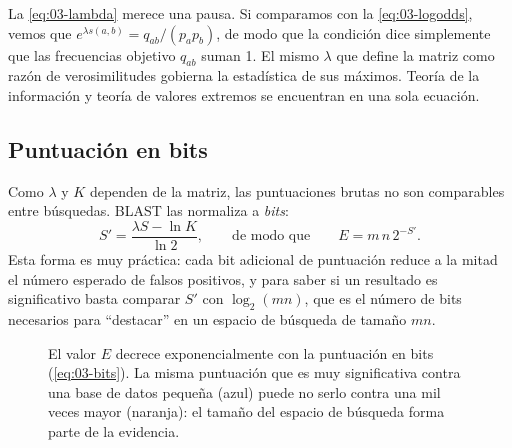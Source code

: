 La \cref{eq:03-lambda} merece una pausa. Si comparamos con la \cref{eq:03-logodds}, vemos que $e^{\lambda s(a,b)} = q_{ab}/(p_ap_b)$, de modo que la condición dice simplemente que las frecuencias objetivo $q_{ab}$ suman 1. El mismo $\lambda$ que define la matriz como razón de verosimilitudes gobierna la estadística de sus máximos. Teoría de la información y teoría de valores extremos se encuentran en una sola ecuación.

\subsection{Puntuación en bits}

Como $\lambda$ y $K$ dependen de la matriz, las puntuaciones brutas no son comparables entre búsquedas. BLAST las normaliza a \emph{bits}:
\begin{equation}\label{eq:03-bits}
S' = \frac{\lambda S - \ln K}{\ln 2}, \qquad\text{de modo que}\qquad E = m\,n\,2^{-S'}.
\end{equation}
Esta forma es muy práctica: cada bit adicional de puntuación reduce a la mitad el número esperado de falsos positivos, y para saber si un resultado es significativo basta comparar $S'$ con $\log_2(mn)$, que es el número de bits necesarios para ``destacar'' en un espacio de búsqueda de tamaño $mn$.

\begin{figure}[t]
\centering
{}
\caption[Valor $E$ frente a puntuación en bits]{El valor $E$ decrece exponencialmente con la puntuación en bits (\cref{eq:03-bits}). La misma puntuación que es muy significativa contra una base de datos pequeña (azul) puede no serlo contra una mil veces mayor (naranja): el tamaño del espacio de búsqueda forma parte de la evidencia.}
\label{fig:03-evalue}
\end{figure}

